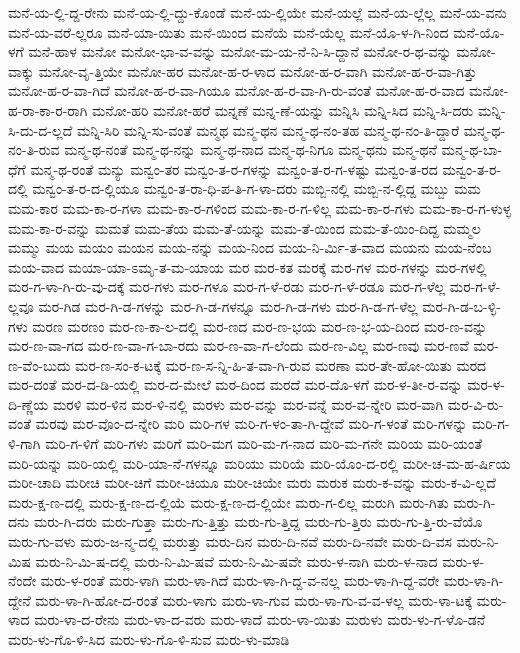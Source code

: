 {ಮನೆ-ಯ-ಲ್ಲಿ-ದ್ದ-ರೇನು
ಮನೆ-ಯ-ಲ್ಲಿ-ದ್ದು-ಕೊಂಡೆ
ಮನೆ-ಯ-ಲ್ಲಿಯೇ
ಮನೆ-ಯಲ್ಲೆ
ಮನೆ-ಯ-ಲ್ಲೆಲ್ಲ
ಮನೆ-ಯ-ವನು
ಮನೆ-ಯ-ವರೆ-ಲ್ಲರೂ
ಮನೆ-ಯಾ-ಯಿತು
ಮನೆ-ಯಿಂದ
ಮನೆಯೆ
ಮನೆ-ಯೆಲ್ಲ
ಮನೆ-ಯೊ-ಳ-ಗಿ-ನಿಂದ
ಮನೆ-ಯೊ-ಳಗೆ
ಮನೆ-ಹಾಳ
ಮನೋ
ಮನೋ-ಭಾ-ವ-ವನ್ನು
ಮನೋ-ಮ-ಯ-ನೆ-ನಿ-ಸಿ-ದ್ದಾನೆ
ಮನೋ-ರ-ಥ-ವನ್ನು
ಮನೋ-ವಾಕ್ಕು
ಮನೋ-ವೃ-ತ್ತಿಯೇ
ಮನೋ-ಹರ
ಮನೋ-ಹ-ರ-ಳಾದ
ಮನೋ-ಹ-ರ-ವಾಗಿ
ಮನೋ-ಹ-ರ-ವಾ-ಗಿತ್ತು
ಮನೋ-ಹ-ರ-ವಾ-ಗಿದೆ
ಮನೋ-ಹ-ರ-ವಾ-ಗಿಯೂ
ಮನೋ-ಹ-ರ-ವಾ-ಗಿ-ರು-ವಂತೆ
ಮನೋ-ಹ-ರ-ವಾದ
ಮನೋ-ಹ-ರಾ-ಕಾ-ರ-ರಾಗಿ
ಮನೋ-ಹರಿ
ಮನೋ-ಹರೆ
ಮನ್ನಣೆ
ಮನ್ನ-ಣೆ-ಯನ್ನು
ಮನ್ನಿಸಿ
ಮನ್ನಿ-ಸಿದ
ಮನ್ನಿ-ಸಿ-ದರು
ಮನ್ನಿ-ಸಿ-ದು-ದ-ಲ್ಲದೆ
ಮನ್ನಿ-ಸಿರಿ
ಮನ್ನಿ-ಸು-ವಂತೆ
ಮನ್ಮಥ
ಮನ್ಮ-ಥನ
ಮನ್ಮ-ಥ-ನಂ-ತಹ
ಮನ್ಮ-ಥ-ನಂ-ತಿ-ದ್ದಾರೆ
ಮನ್ಮ-ಥ-ನಂ-ತಿ-ರುವ
ಮನ್ಮ-ಥ-ನಂತೆ
ಮನ್ಮ-ಥ-ನನ್ನು
ಮನ್ಮ-ಥ-ನಾದ
ಮನ್ಮ-ಥ-ನಿಗೂ
ಮನ್ಮ-ಥನು
ಮನ್ಮ-ಥನೆ
ಮನ್ಮ-ಥ-ಬಾ-ಧೆಗೆ
ಮನ್ಮ-ಥ-ರಂತೆ
ಮನ್ಯು
ಮನ್ವಂ-ತರ
ಮನ್ವಂ-ತ-ರ-ಗಳನ್ನು
ಮನ್ವಂ-ತ-ರ-ಗ-ಳಷ್ಟು
ಮನ್ವಂ-ತ-ರದ
ಮನ್ವಂ-ತ-ರ-ದಲ್ಲಿ
ಮನ್ವಂ-ತ-ರ-ದ-ಲ್ಲಿಯೂ
ಮನ್ವಂ-ತ-ರಾ-ಧಿ-ಪ-ತಿ-ಗ-ಳಾ-ದರು
ಮಬ್ಬಿ-ನಲ್ಲಿ
ಮಬ್ಬಿ-ನ-ಲ್ಲಿದ್ದ
ಮಬ್ಬು
ಮಮ
ಮಮ-ಕಾರ
ಮಮ-ಕಾ-ರ-ಗಳಾ
ಮಮ-ಕಾ-ರ-ಗಳಿಂದ
ಮಮ-ಕಾ-ರ-ಗ-ಳಿಲ್ಲ
ಮಮ-ಕಾ-ರ-ಗಳು
ಮಮ-ಕಾ-ರ-ಗ-ಳುಳ್ಳ
ಮಮ-ಕಾ-ರ-ವನ್ನು
ಮಮತೆ
ಮಮ-ತೆಯ
ಮಮ-ತೆ-ಯನ್ನು
ಮಮ-ತೆ-ಯಿಂದ
ಮಮ-ತೆ-ಯಿಂ-ದಿದ್ದ
ಮಮ್ಮಲ
ಮಮ್ಮು
ಮಯ
ಮಯಂ
ಮಯನ
ಮಯ-ನನ್ನು
ಮಯ-ನಿಂದ
ಮಯ-ನಿ-ರ್ಮಿ-ತ-ವಾದ
ಮಯನು
ಮಯ-ನೆಂಬ
ಮಯ-ವಾದ
ಮಯಾ-ಯಾ-ಽಮೃ-ತ-ಮ-ಯಾಯ
ಮರ
ಮರ-ಕತ
ಮರಕ್ಕೆ
ಮರ-ಗಳ
ಮರ-ಗಳನ್ನು
ಮರ-ಗಳಲ್ಲಿ
ಮರ-ಗ-ಳಾ-ಗಿ-ರು-ವು-ದಕ್ಕೆ
ಮರ-ಗಳು
ಮರ-ಗಳೂ
ಮರ-ಗ-ಳೆ-ರಡು
ಮರ-ಗ-ಳೆ-ರಡೂ
ಮರ-ಗ-ಳೆಲ್ಲ
ಮರ-ಗ-ಳೆ-ಲ್ಲವೂ
ಮರ-ಗಿಡ
ಮರ-ಗಿ-ಡ-ಗಳನ್ನು
ಮರ-ಗಿ-ಡ-ಗಳನ್ನೂ
ಮರ-ಗಿ-ಡ-ಗಳು
ಮರ-ಗಿ-ಡ-ಗ-ಳೆಲ್ಲ
ಮರ-ಗಿ-ಡ-ಬ-ಳ್ಳಿ-ಗಳು
ಮರಣ
ಮರಣಂ
ಮರ-ಣ-ಕಾ-ಲ-ದಲ್ಲಿ
ಮರ-ಣದ
ಮರ-ಣ-ಭಯ
ಮರ-ಣ-ಭ-ಯ-ದಿಂದ
ಮರ-ಣ-ವನ್ನು
ಮರ-ಣ-ವಾ-ಗದ
ಮರ-ಣ-ವಾ-ಗ-ಬಾ-ರದು
ಮರ-ಣ-ವಾ-ಗ-ಲೆಂದು
ಮರ-ಣ-ವಿಲ್ಲ
ಮರ-ಣವು
ಮರ-ಣವೆ
ಮರ-ಣ-ವೆಂ-ಬುದು
ಮರ-ಣ-ಸಂ-ಕ-ಟಕ್ಕೆ
ಮರ-ಣ-ಸ-ನ್ನಿ-ಹಿ-ತ-ವಾ-ಗಿ-ರುವ
ಮರಣಾ
ಮರ-ತೇ-ಹೋ-ಯಿತು
ಮರದ
ಮರ-ದಂತೆ
ಮರ-ದ-ಡಿ-ಯಲ್ಲಿ
ಮರ-ದ-ಮೇಲೆ
ಮರ-ದಿಂದ
ಮರದೆ
ಮರ-ದೊ-ಳಗೆ
ಮರ-ಳ-ತೀ-ರ-ವನ್ನು
ಮರ-ಳ-ದಿ-ಣ್ಣೆಯ
ಮರಳಿ
ಮರ-ಳಿನ
ಮರ-ಳಿ-ನಲ್ಲಿ
ಮರಳು
ಮರ-ವನ್ನು
ಮರ-ವನ್ನೆ
ಮರ-ವ-ನ್ನೇರಿ
ಮರ-ವಾಗಿ
ಮರ-ವಿ-ರು-ವಂತೆ
ಮರವು
ಮರ-ವೊಂ-ದ-ನ್ನೇರಿ
ಮರಿ
ಮರಿ-ಗಳ
ಮರಿ-ಗ-ಳಂ-ತಾ-ಗಿ-ದ್ದೇವೆ
ಮರಿ-ಗ-ಳಂತೆ
ಮರಿ-ಗಳನ್ನು
ಮರಿ-ಗ-ಳಿ-ಗಾಗಿ
ಮರಿ-ಗ-ಳಿಗೆ
ಮರಿ-ಗಳು
ಮರಿಗೆ
ಮರಿ-ಮಗ
ಮರಿ-ಮ-ಗ-ನಾದ
ಮರಿ-ಮ-ಗನೇ
ಮರಿಯ
ಮರಿ-ಯಂತೆ
ಮರಿ-ಯನ್ನು
ಮರಿ-ಯಲ್ಲಿ
ಮರಿ-ಯಾ-ನೆ-ಗಳನ್ನೂ
ಮರಿಯು
ಮರಿಯೆ
ಮರಿ-ಯೊಂ-ದ-ರಲ್ಲಿ
ಮರೀ-ಚ-ಮ-ಹ-ರ್ಷಿಯ
ಮರೀ-ಚಾದಿ
ಮರೀಚಿ
ಮರೀ-ಚಿಗೆ
ಮರೀ-ಚಿಯೂ
ಮರೀ-ಚಿಯೇ
ಮರು
ಮರುಕ
ಮರು-ಕ-ವನ್ನು
ಮರು-ಕ-ವಿ-ಲ್ಲದೆ
ಮರು-ಕ್ಷ-ಣ-ದಲ್ಲಿ
ಮರು-ಕ್ಷ-ಣ-ದ-ಲ್ಲಿಯೆ
ಮರು-ಕ್ಷ-ಣ-ದ-ಲ್ಲಿಯೇ
ಮರು-ಗ-ಲಿಲ್ಲ
ಮರುಗಿ
ಮರು-ಗಿತು
ಮರು-ಗಿ-ದನು
ಮರು-ಗಿ-ದರು
ಮರು-ಗುತ್ತಾ
ಮರು-ಗು-ತ್ತಿತ್ತು
ಮರು-ಗು-ತ್ತಿದ್ದ
ಮರು-ಗು-ತ್ತಿರು
ಮರು-ಗು-ತ್ತಿ-ರು-ವೆಯೊ
ಮರು-ಗು-ವಳು
ಮರು-ಜ-ನ್ಮ-ದಲ್ಲಿ
ಮರುತ್ತು
ಮರು-ದಿನ
ಮರು-ದಿ-ನವೆ
ಮರು-ದಿ-ನವೇ
ಮರು-ದಿ-ವಸ
ಮರು-ನಿ-ಮಿಷ
ಮರು-ನಿ-ಮಿ-ಷ-ದಲ್ಲಿ
ಮರು-ನಿ-ಮಿ-ಷವೆ
ಮರು-ನಿ-ಮಿ-ಷವೇ
ಮರು-ಳ-ನಾಗಿ
ಮರು-ಳ-ನಾದ
ಮರು-ಳ-ನೆಂದೇ
ಮರು-ಳ-ರಂತೆ
ಮರು-ಳಾಗಿ
ಮರು-ಳಾ-ಗಿದೆ
ಮರು-ಳಾ-ಗಿ-ದ್ದ-ವ-ನಲ್ಲ
ಮರು-ಳಾ-ಗಿ-ದ್ದ-ವರೇ
ಮರು-ಳಾ-ಗಿ-ದ್ದೇನೆ
ಮರು-ಳಾ-ಗಿ-ಹೋ-ದ-ರಂತೆ
ಮರು-ಳಾಗು
ಮರು-ಳಾ-ಗುವ
ಮರು-ಳಾ-ಗು-ವ-ವ-ಳಲ್ಲ
ಮರು-ಳಾ-ಟಕ್ಕೆ
ಮರು-ಳಾದ
ಮರು-ಳಾ-ದ-ರೇನು
ಮರು-ಳಾ-ದ-ವರು
ಮರು-ಳಾದೆ
ಮರು-ಳಾ-ಯಿತು
ಮರುಳು
ಮರು-ಳು-ಗ-ಳೊ-ಡನೆ
ಮರು-ಳು-ಗೊ-ಳಿ-ಸಿದ
ಮರು-ಳು-ಗೊ-ಳಿ-ಸುವ
ಮರು-ಳು-ಮಾಡಿ
}
